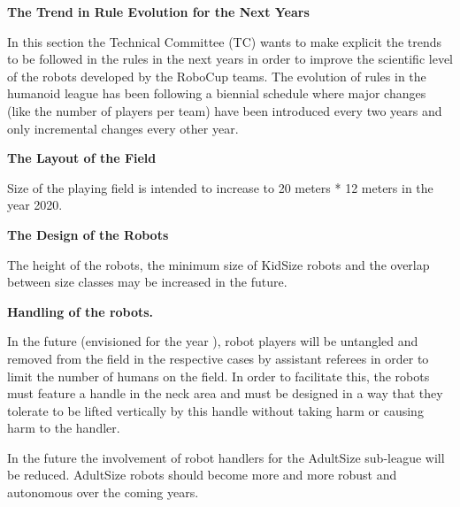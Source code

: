 \clearpage
\sffamily
{\bfseries\color[rgb]{0.4,0.4,0.4}
The Trend in Rule Evolution for the Next Years }

\bigskip

In this section the Technical Committee (TC) wants to make explicit the trends to be followed in the rules in the next years in order to improve the scientific level of the robots developed by the RoboCup teams. The evolution of rules in the humanoid league has been following
a biennial schedule where major changes (like the number of players per team) have been introduced every two years and only incremental changes every other year.

\bigskip

{\bfseries The Layout of the Field}

\headlinebox

Size of the playing field is intended to increase to 20 meters * 12 meters in the year 2020.

\bigskip

{\bfseries The Design of the Robots}

\headlinebox

The height of the robots, the minimum size of KidSize robots and the overlap between size classes may be increased in the future.
\bigskip


\bigskip

{\bfseries Handling of the robots.}

\headlinebox

In the future (envisioned for the year ), robot players will be untangled and removed from the field in the respective cases by assistant referees in order to limit the number of humans on the field. In order to facilitate this, the robots must feature a handle in the neck area and must be designed in a way that they tolerate to be lifted vertically by this handle without taking harm or causing harm to the handler.

\bigskip

In the future the involvement of robot handlers for the AdultSize sub-league will be reduced. AdultSize robots should become more and more robust and autonomous over the coming years.

\bigskip

